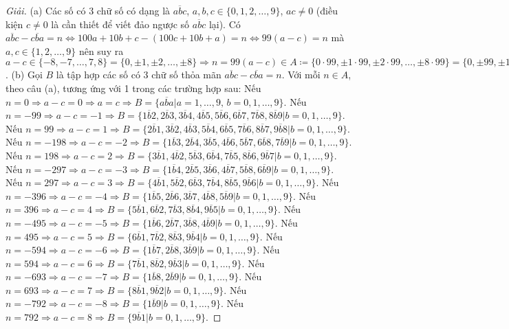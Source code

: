 \documentclass{article}
\begin{document}
\begin{proof}[Giải]
	(a) Các số có 3 chữ số có dạng là $\overline{abc}$, $a,b,c\in\{0,1,2,\ldots,9\}$, $ac\ne0$ (điều kiện $c\ne0$ là cần thiết để viết đảo ngược số $\overline{abc}$ lại). Có $\overline{abc} - \overline{cba} = n\Leftrightarrow100a + 10b + c - (100c + 10b + a) = n\Leftrightarrow99(a - c) = n$ mà $a,c\in\{1,2,\ldots,9\}$ nên suy ra $a - c\in\{-8,-7,\ldots,7,8\} = \{0,\pm1,\pm2,\ldots,\pm8\}\Rightarrow n = 99(a - c)\in A\coloneqq\{0\cdot99,\pm1\cdot99,\pm2\cdot99,\ldots,\pm8\cdot99\} = \{0,\pm99,\pm198,\pm297,\pm396,\pm495,\pm594,\pm693,\pm792\}$. (b) Gọi $B$ là tập hợp các số có 3 chữ số thỏa mãn $\overline{abc} - \overline{cba} = n$. Với mỗi $n\in A$, theo câu (a), tương ứng với 1 trong các trường hợp sau: Nếu $n = 0\Rightarrow a - c = 0\Rightarrow a = c\Rightarrow B = \{\overline{aba}|a = 1,\ldots,9,\,b = 0,1,\ldots,9\}$. Nếu $n = -99\Rightarrow a - c = -1\Rightarrow B = \{\overline{1b2},\overline{2b3},\overline{3b4},\overline{4b5},\overline{5b6},\overline{6b7},\overline{7b8},\overline{8b9}|b = 0,1,\ldots,9\}$. Nếu $n = 99\Rightarrow a - c = 1\Rightarrow B = \{\overline{2b1},\overline{3b2},\overline{4b3},\overline{5b4},\overline{6b5},\overline{7b6},\overline{8b7},\overline{9b8}|b = 0,1,\ldots,9\}$. Nếu $n = -198\Rightarrow a - c = -2\Rightarrow B = \{\overline{1b3},\overline{2b4},\overline{3b5},\overline{4b6},\overline{5b7},\overline{6b8},\overline{7b9}|b = 0,1,\ldots,9\}$. Nếu $n = 198\Rightarrow a - c = 2\Rightarrow B = \{\overline{3b1},\overline{4b2},\overline{5b3},\overline{6b4},\overline{7b5},\overline{8b6},\overline{9b7}|b = 0,1,\ldots,9\}$. Nếu $n = -297\Rightarrow a - c = -3\Rightarrow B = \{\overline{1b4},\overline{2b5},\overline{3b6},\overline{4b7},\overline{5b8},\overline{6b9}|b = 0,1,\ldots,9\}$. Nếu $n = 297\Rightarrow a - c = 3\Rightarrow B = \{\overline{4b1},\overline{5b2},\overline{6b3},\overline{7b4},\overline{8b5},\overline{9b6}|b = 0,1,\ldots,9\}$. Nếu $n = -396\Rightarrow a - c = -4\Rightarrow B = \{\overline{1b5},\overline{2b6},\overline{3b7},\overline{4b8},\overline{5b9}|b = 0,1,\ldots,9\}$. Nếu $n = 396\Rightarrow a - c = 4\Rightarrow B = \{\overline{5b1},\overline{6b2},\overline{7b3},\overline{8b4},\overline{9b5}|b = 0,1,\ldots,9\}$. Nếu $n = -495\Rightarrow a - c = -5\Rightarrow B = \{\overline{1b6},\overline{2b7},\overline{3b8},\overline{4b9}|b = 0,1,\ldots,9\}$. Nếu $n = 495\Rightarrow a - c = 5\Rightarrow B = \{\overline{6b1},\overline{7b2},\overline{8b3},\overline{9b4}|b = 0,1,\ldots,9\}$. Nếu $n = -594\Rightarrow a - c = -6\Rightarrow B = \{\overline{1b7},\overline{2b8},\overline{3b9}|b = 0,1,\ldots,9\}$. Nếu $n = 594\Rightarrow a - c = 6\Rightarrow B = \{\overline{7b1},\overline{8b2},\overline{9b3}|b = 0,1,\ldots,9\}$. Nếu $n = -693\Rightarrow a - c = -7\Rightarrow B = \{\overline{1b8},\overline{2b9}|b = 0,1,\ldots,9\}$. Nếu $n = 693\Rightarrow a - c = 7\Rightarrow B = \{\overline{8b1},\overline{9b2}|b = 0,1,\ldots,9\}$. Nếu $n = -792\Rightarrow a - c = -8\Rightarrow B = \{\overline{1b9}|b = 0,1,\ldots,9\}$. Nếu $n = 792\Rightarrow a - c = 8\Rightarrow B = \{\overline{9b1}|b = 0,1,\ldots,9\}$.
\end{proof}
\end{document}

